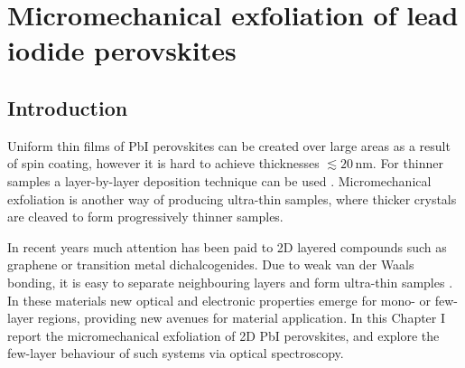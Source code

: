 
\chapter{Micromechanical exfoliation of lead iodide perovskites}

\graphicspath{{Chapter5/Figures/}}


\section{Introduction}
Uniform thin films of PbI perovskites can be created over large areas as a result of spin coating, however it is hard to achieve thicknesses $\lesssim20$\,nm. For thinner samples a layer-by-layer deposition technique can be used \cite{Era2000, Matsui2002}. Micromechanical exfoliation is another way of producing ultra-thin samples, where thicker crystals are cleaved to form progressively thinner samples.

In recent years much attention has been paid to 2D layered compounds such as graphene or transition metal dichalcogenides. Due to weak van der Waals bonding, it is easy to separate neighbouring layers and form ultra-thin samples \cite{Novoselov2004, Blake2007, Ni2007, Splendiani2010, Castellanos-Gomez2010, Tonndorf2013}. In these materials new optical and electronic properties emerge for mono- or few-layer regions, providing new avenues for material application. In this Chapter I report the micromechanical exfoliation of 2D PbI perovskites, and explore the few-layer behaviour of such systems via optical spectroscopy.

